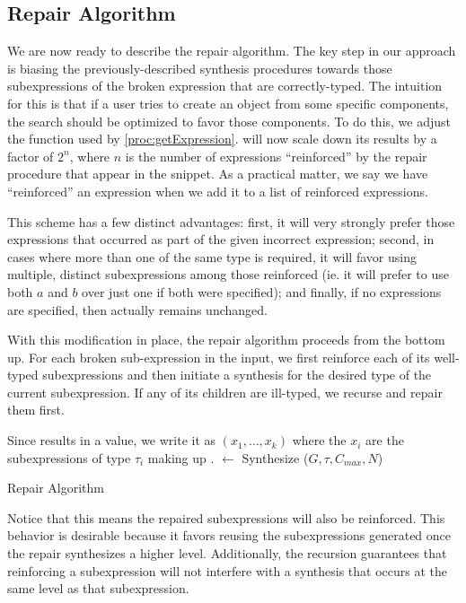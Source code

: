 \subsection{Repair Algorithm}
\label{sec:algorithm:repair}
We are now ready to describe the repair algorithm. The key step in our
approach is biasing the previously-described synthesis procedures
towards those subexpressions of the broken expression that are
correctly-typed. The intuition for this is that if a user tries to
create an object from some specific components, the search should be
optimized to favor those components. To do this, we adjust the \Cost
function used by \ref{proc:getExpression}. \Cost will now scale down
its results by a factor of $2^n$, where $n$ is the number of
expressions ``reinforced'' by the repair procedure that appear in the
snippet. As a practical matter, we say we have ``reinforced'' an
expression when we add it to a list of reinforced expressions.

This scheme has a few distinct advantages: first, it will very
strongly prefer those expressions that occurred as part of the given
incorrect expression; second, in cases where more than one of the same
type is required, it will favor using multiple, distinct
subexpressions among those reinforced (ie. it will prefer to use both
$a$ and $b$ over just one if both were specified); and finally, if no
expressions are specified, then \Cost actually remains unchanged.

With this modification in place, the repair algorithm proceeds from
the bottom up. For each broken sub-expression in the input, we first
reinforce each of its well-typed subexpressions and then initiate a
synthesis for the desired type of the current subexpression. If any of
its children are ill-typed, we recurse and repair them first.
\begin{algorithm}
\Output{\Repairs}
\BlankLine
{}
Since \Expr results in a value, we write it as \Expr$(x_1, \ldots, x_k)$ where the $x_i$ are the subexpressions of type $\tau_i$ making up \Expr.
\Repairs $\longleftarrow$ Synthesize ($G, \tau, C_{max}, N$)
\caption{Repair Algorithm}\label{proc:repair}
\end{algorithm}
Notice that this means the repaired subexpressions will also be
reinforced. This behavior is desirable because it favors reusing the
subexpressions generated once the repair synthesizes a higher
level. Additionally, the recursion guarantees that reinforcing a
subexpression will not interfere with a synthesis that occurs at the
same level as that subexpression.

